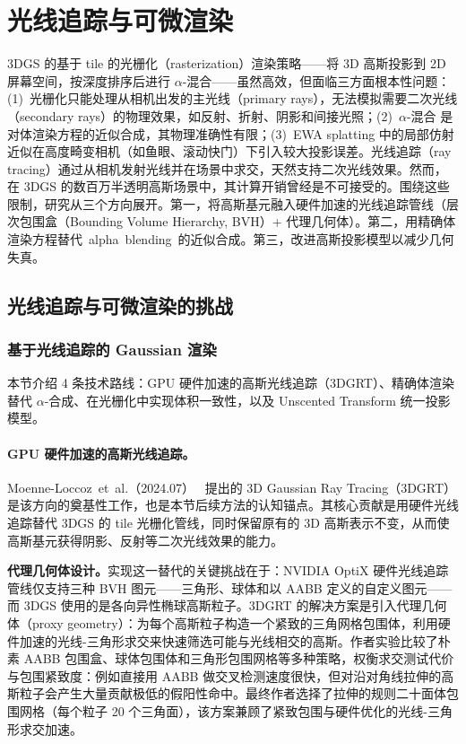 

\section{光线追踪与可微渲染}
\label{sec:02_5}

3DGS 的基于 tile 的光栅化（rasterization）渲染策略——将 3D 高斯投影到 2D 屏幕空间，按深度排序后进行 $\alpha$-混合——虽然高效，但面临三方面根本性问题：(1)~光栅化只能处理从相机出发的主光线（primary rays），无法模拟需要二次光线（secondary rays）的物理效果，如反射、折射、阴影和间接光照；(2)~$\alpha$-混合 是对体渲染方程的近似合成，其物理准确性有限；(3)~EWA splatting 中的局部仿射近似在高度畸变相机（如鱼眼、滚动快门）下引入较大投影误差。光线追踪（ray tracing）通过从相机发射光线并在场景中求交，天然支持二次光线效果。然而，在 3DGS 的数百万半透明高斯场景中，其计算开销曾经是不可接受的。围绕这些限制，研究从三个方向展开。第一，将高斯基元融入硬件加速的光线追踪管线（层次包围盒（Bounding Volume Hierarchy, BVH）+ 代理几何体）。第二，用精确体渲染方程替代~alpha~blending~的近似合成。第三，改进高斯投影模型以减少几何失真。

\subsection{光线追踪与可微渲染的挑战}

\subsubsection{基于光线追踪的 Gaussian 渲染}

本节介绍 4 条技术路线：GPU 硬件加速的高斯光线追踪（3DGRT）、精确体渲染替代 $\alpha$-合成、在光栅化中实现体积一致性，以及 Unscented Transform 统一投影模型。

\paragraph{GPU 硬件加速的高斯光线追踪。}

Moenne-Loccoz~et~al.（2024.07）~\cite{2407_07090} 提出的 3D Gaussian Ray Tracing（3DGRT）是该方向的奠基性工作，也是本节后续方法的认知锚点。其核心贡献是用硬件光线追踪替代 3DGS 的 tile 光栅化管线，同时保留原有的 3D 高斯表示不变，从而使高斯基元获得阴影、反射等二次光线效果的能力。

\textbf{代理几何体设计。}实现这一替代的关键挑战在于：NVIDIA OptiX 硬件光线追踪管线仅支持三种 BVH 图元——三角形、球体和以 AABB 定义的自定义图元——而 3DGS 使用的是各向异性椭球高斯粒子。3DGRT 的解决方案是引入代理几何体（proxy geometry）：为每个高斯粒子构造一个紧致的三角网格包围体，利用硬件加速的光线-三角形求交来快速筛选可能与光线相交的高斯。作者实验比较了朴素 AABB 包围盒、球体包围体和三角形包围网格等多种策略，权衡求交测试代价与包围紧致度：例如直接用 AABB 做交叉检测速度很快，但对沿对角线拉伸的高斯粒子会产生大量贡献极低的假阳性命中。最终作者选择了拉伸的规则二十面体包围网格（每个粒子 20 个三角面），该方案兼顾了紧致包围与硬件优化的光线-三角形求交加速。

